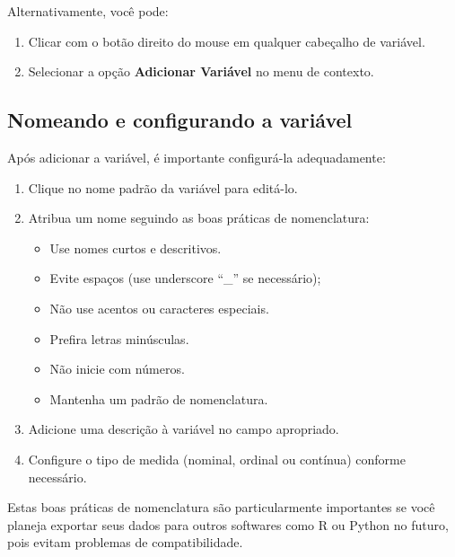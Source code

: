 Alternativamente, você pode:
\begin{enumerate}
    \item Clicar com o botão direito do mouse em qualquer cabeçalho de variável.
    \item Selecionar a opção \textbf{Adicionar Variável} no menu de contexto.
\end{enumerate}


\subsection{Nomeando e configurando a variável}

Após adicionar a variável, é importante configurá-la adequadamente:

\begin{enumerate}
    \item Clique no nome padrão da variável para editá-lo.
    \item Atribua um nome seguindo as boas práticas de nomenclatura:
    \begin{itemize}
        \item Use nomes curtos e descritivos.
        \item Evite espaços (use underscore ``\_'' se necessário);
        \item Não use acentos ou caracteres especiais.
        \item Prefira letras minúsculas.
        \item Não inicie com números.
        \item Mantenha um padrão de nomenclatura.
    \end{itemize}
    \item Adicione uma descrição à variável no campo apropriado.
    \item Configure o tipo de medida (nominal, ordinal ou contínua) conforme necessário.
\end{enumerate}

Estas boas práticas de nomenclatura são particularmente importantes se você planeja exportar seus dados para outros softwares como R ou Python no futuro, pois evitam problemas de compatibilidade.

